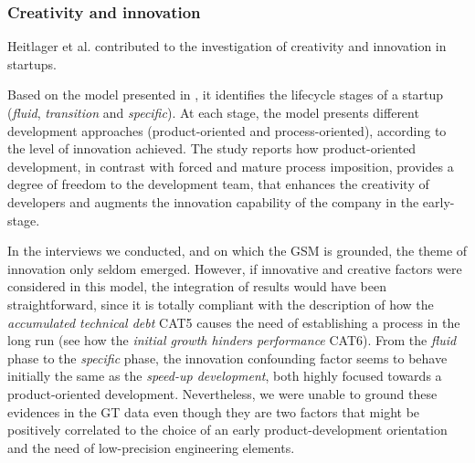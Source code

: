 \documentclass[10pt,journal,letterpaper,compsoc]{IEEEtran}
\begin{document}
\subsubsection{Creativity and innovation} 
Heitlager et al. \cite{Heitlager2007} contributed to the investigation of 
creativity and innovation in startups. 

Based on the model presented in \cite{Heitlager2007}, it identifies the 
lifecycle stages of a startup (\textit{fluid}, \textit{transition} and 
\textit{specific}). At each stage, the model presents different development approaches 
(product-oriented and process-oriented), according to the level of innovation achieved. The 
study reports how product-oriented development, in contrast with forced and 
mature process imposition, provides a degree of freedom to the development team, 
that enhances the creativity of developers and augments the innovation 
capability of the company in the early-stage.


In the interviews we conducted, and on which the GSM is grounded, the theme of 
innovation only seldom emerged. However, if innovative and creative factors were 
considered in this model, the integration of results would have been 
straightforward, since it is totally compliant with the description of how the \textit{accumulated technical debt} CAT5 causes the need of establishing a process in the long run (see how the \textit{initial growth hinders performance} CAT6). %
From the \textit{fluid} phase to the \textit{specific} phase, the innovation 
confounding factor seems to behave initially the same as the \textit{speed-up 
development}, both highly focused towards a product-oriented development. %
Nevertheless, we were unable to ground these evidences in the GT data even 
though they are two factors that might be positively correlated %
to the choice of an early product-development orientation and the need of low-precision 
engineering elements.
\end{document}
